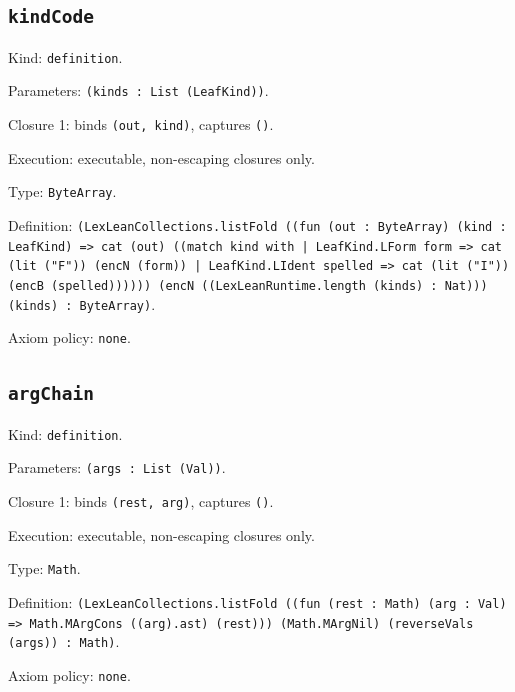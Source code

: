 \documentclass[11pt]{article}
\begin{document}
\subsection*{\texttt{kindCode}}
\noindent Kind: \texttt{definition}.\par
\noindent Parameters: \texttt{(kinds : List (LeafKind))}.\par
\noindent Closure 1: binds \texttt{(out, kind)}, captures \texttt{()}.\par
\noindent Execution: executable, non-escaping closures only.\par
\noindent Type: \texttt{ByteArray}.\par
\noindent Definition: \texttt{(LexLeanCollections.listFold ((fun (out : ByteArray) (kind : LeafKind) => cat (out) ((match kind with | LeafKind.LForm form => cat (lit ("F")) (encN (form)) | LeafKind.LIdent spelled => cat (lit ("I")) (encB (spelled)))))) (encN ((LexLeanRuntime.length (kinds) : Nat))) (kinds) : ByteArray)}.\par
\noindent Axiom policy: \texttt{none}.\par
\subsection*{\texttt{argChain}}
\noindent Kind: \texttt{definition}.\par
\noindent Parameters: \texttt{(args : List (Val))}.\par
\noindent Closure 1: binds \texttt{(rest, arg)}, captures \texttt{()}.\par
\noindent Execution: executable, non-escaping closures only.\par
\noindent Type: \texttt{Math}.\par
\noindent Definition: \texttt{(LexLeanCollections.listFold ((fun (rest : Math) (arg : Val) => Math.MArgCons ((arg).ast) (rest))) (Math.MArgNil) (reverseVals (args)) : Math)}.\par
\noindent Axiom policy: \texttt{none}.\par
\end{document}
